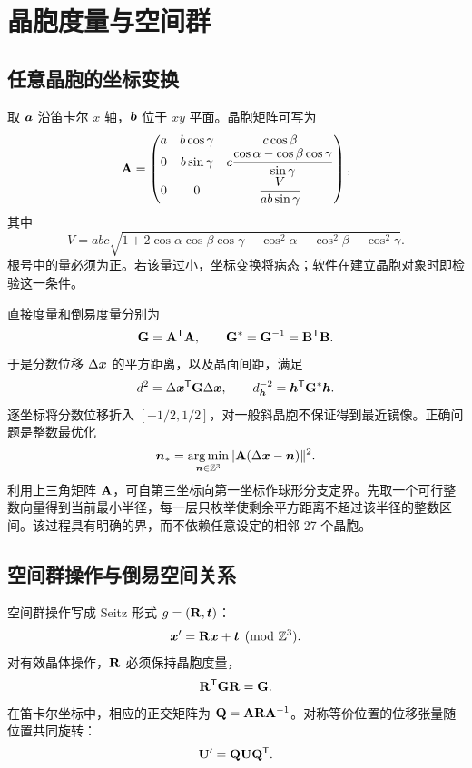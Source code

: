 \chapter{晶胞度量与空间群}
\section{任意晶胞的坐标变换}
取 $\bm{a}$ 沿笛卡尔 $x$ 轴，$\bm{b}$ 位于 $xy$ 平面。晶胞矩阵可写为
\begin{equation}
\mathbf{A}=\begin{pmatrix}
a&b\cos\gamma&c\cos\beta\\
0&b\sin\gamma&c\dfrac{\cos\alpha-\cos\beta\cos\gamma}{\sin\gamma}\\
0&0&\dfrac{V}{ab\sin\gamma}
\end{pmatrix},
\end{equation}
其中
\begin{equation}
V=abc\sqrt{1+2\cos\alpha\cos\beta\cos\gamma
-\cos^2\alpha-\cos^2\beta-\cos^2\gamma}.
\end{equation}
根号中的量必须为正。若该量过小，坐标变换将病态；软件在建立晶胞对象时即检验这一条件。

直接度量和倒易度量分别为
\begin{equation}
\mathbf{G}=\mathbf{A}^{\mathsf T}\mathbf{A},\qquad
\mathbf{G}^*=\mathbf{G}^{-1}=\mathbf{B}^{\mathsf T}\mathbf{B}.
\end{equation}
于是分数位移 $\Delta\bm{x}$ 的平方距离，以及晶面间距，满足
\begin{equation}
d^2=\Delta\bm{x}^{\mathsf T}\mathbf{G}\Delta\bm{x},\qquad
d_{\bm{h}}^{-2}=\bm{h}^{\mathsf T}\mathbf{G}^*\bm{h}.
\end{equation}
逐坐标将分数位移折入 $[-1/2,1/2]$，对一般斜晶胞不保证得到最近镜像。正确问题是整数最优化
\begin{equation}
\bm{n}_* =\operatorname*{arg\,min}_{\bm{n}\in\mathbb Z^3}
\lVert\mathbf{A}(\Delta\bm{x}-\bm{n})\rVert^2.
\label{eq:cvp}
\end{equation}
利用上三角矩阵 $\mathbf{A}$，可自第三坐标向第一坐标作球形分支定界。先取一个可行整数向量得到当前最小半径，每一层只枚举使剩余平方距离不超过该半径的整数区间。该过程具有明确的界，而不依赖任意设定的相邻 27 个晶胞。

\section{空间群操作与倒易空间关系}
空间群操作写成 Seitz 形式 $g=(\mathbf{R},\bm{t})$：
\begin{equation}
\bm{x}'=\mathbf{R}\bm{x}+\bm{t}\pmod{\mathbb Z^3}.
\end{equation}
对有效晶体操作，$\mathbf{R}$ 必须保持晶胞度量，
\begin{equation}
\mathbf{R}^{\mathsf T}\mathbf{G}\mathbf{R}=\mathbf{G}.
\end{equation}
在笛卡尔坐标中，相应的正交矩阵为 $\mathbf{Q}=\mathbf{A}\mathbf{R}\mathbf{A}^{-1}$。对称等价位置的位移张量随位置共同旋转：
\begin{equation}
\mathbf{U}'=\mathbf{Q}\mathbf{U}\mathbf{Q}^{\mathsf T}.
\end{equation}

